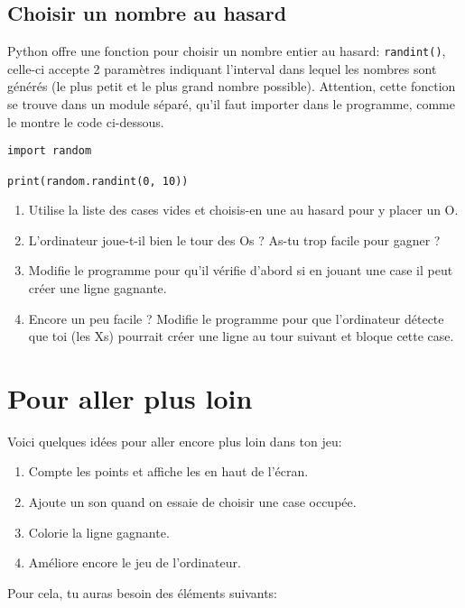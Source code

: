 \documentclass[11pt]{article}
\begin{document}
\subsection*{Choisir un nombre au hasard}

Python offre une fonction pour choisir un nombre entier au hasard: \lstinline{randint()}, celle-ci accepte 2 paramètres indiquant l'interval dans lequel les nombres sont générés (le plus petit et le plus grand nombre possible). Attention, cette fonction se trouve dans un module séparé, qu'il faut importer dans le programme, comme le montre le code ci-dessous.

\begin{lstlisting}
import random

print(random.randint(0, 10))
\end{lstlisting}


\begin{enumerate}
    \item Utilise la liste des cases vides et choisis-en une au hasard pour y placer un O.
    \item L'ordinateur joue-t-il bien le tour des Os ? As-tu trop facile pour gagner ?
    \item Modifie le programme pour qu'il vérifie d'abord si en jouant une case il peut créer une ligne gagnante.
    \item Encore un peu facile ? Modifie le programme pour que l'ordinateur détecte que toi (les Xs) pourrait créer une ligne au tour suivant et bloque cette case.
\end{enumerate}

\pagebreak

\section{Pour aller plus loin}

Voici quelques idées pour aller encore plus loin dans ton jeu:
\begin{enumerate}
    \item Compte les points et affiche les en haut de l'écran.
    \item Ajoute un son quand on essaie de choisir une case occupée.
    \item Colorie la ligne gagnante.
    \item Améliore encore le jeu de l'ordinateur.
\end{enumerate}

Pour cela, tu auras besoin des éléments suivants:
\end{document}
